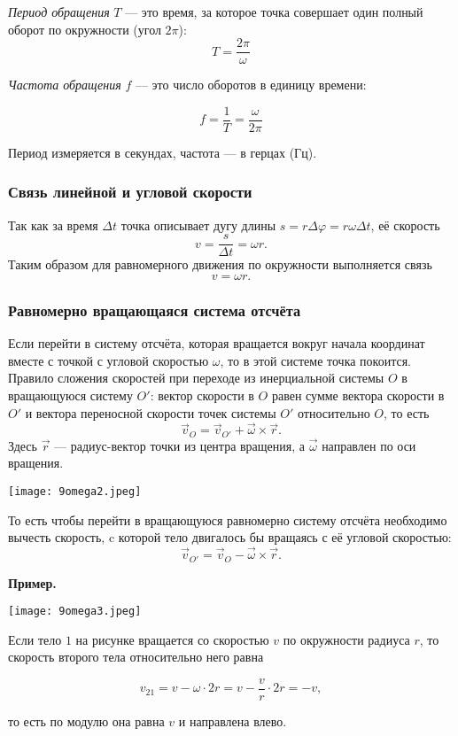\documentclass[12pt, a4paper]{article}%
\begin{document}
\textit{Период обращения} $T$ — это время, за которое точка совершает один полный оборот по окружности (угол $2\pi$):
\[
T = \frac{2\pi}{\omega}
\]

\textit{Частота обращения} $f$ — это число оборотов в единицу времени:

\[
f = \frac{1}{T} = \frac{\omega}{2\pi}
\]

Период измеряется в секундах, частота — в герцах (Гц).




\subsubsection*{Связь линейной и угловой скорости}
Так как за время $\Delta t$ точка описывает дугу длины $s = r\Delta\varphi = r\omega\Delta t$, её скорость
\[
v = \frac{s}{\Delta t} = \omega r.
\]
Таким образом для равномерного движения по окружности выполняется связь
\[
v = \omega r.
\]

\subsubsection*{Равномерно вращающаяся система отсчёта}
Если перейти в систему отсчёта, которая вращается вокруг начала координат вместе с точкой с угловой скоростью $\omega$, 
то в этой системе точка покоится. Правило сложения скоростей при переходе из инерциальной системы $O$ в вращающуюся систему $O'$: вектор скорости в $O$ равен сумме вектора скорости в $O'$ и вектора переносной скорости точек системы $O'$ относительно $O$, то есть
\[
\vec v_O = \vec v_{O'} + \vec\omega \times \vec r.
\]
Здесь $\vec r$ — радиус-вектор точки из центра вращения, а $\vec\omega$ направлен по оси вращения.



\begin{center}
\texttt{[image: 9omega2.jpeg]}
\label{fig:mpr}
\end{center}

То есть чтобы перейти в вращающуюся равномерно систему отсчёта необходимо вычесть скорость, c которой тело двигалось бы вращаясь с её угловой скоростью:
\[
\vec v_{O'} = \vec v_{O} - \vec\omega \times \vec r.
\]

\textbf{Пример.}

\begin{center}
\texttt{[image: 9omega3.jpeg]}
\label{fig:mpr}
\end{center}

Если тело $1$ на рисунке вращается со скоростью $v$ по окружности радиуса $r$, то скорость второго тела относительно него равна

\[
v_{21} = v - \omega \cdot 2r = v - \frac{v}{r}\cdot 2r = -v,
\]

то есть по модулю она равна $v$ и направлена влево.
\end{document}
